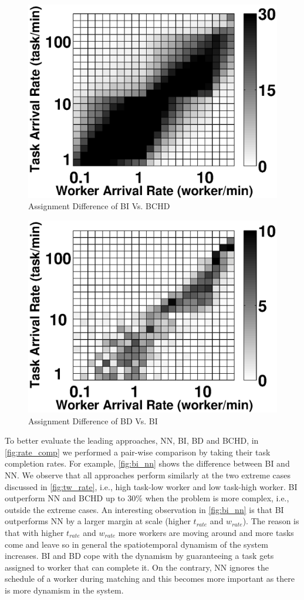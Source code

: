 \begin{figure}[h]
	\centering
	\includegraphics[width = 0.65\columnwidth]{figures/bi_bchd.eps}
	\vspace{-0.1in}
	\caption{Assignment Difference of BI Vs. BCHD}\label{fig:bi_bchd}
\end{figure}

\begin{figure}[h]
	\centering
	\includegraphics[width = 0.65\columnwidth]{figures/emd_bi.eps}
	\vspace{-0.1in}
	\caption{Assignment Difference of BD Vs. BI}\label{fig:emd_bi}
\end{figure}

To better evaluate the leading approaches, NN, BI, BD and BCHD, in \cref{fig:rate_comp} we performed a pair-wise comparison by taking their task completion rates. For example, \cref{fig:bi_nn} shows the difference between BI and NN. We observe that all approaches perform similarly at the two extreme cases discussed in \cref{fig:tw_rate}, i.e., high task-low worker and low task-high worker. BI outperform NN and BCHD up to 30\% when the problem is more complex, i.e., outside the extreme cases. An interesting observation in \cref{fig:bi_nn} is that BI outperforms NN by a larger margin at scale (higher $t_{rate}$ and $w_{rate}$). The reason is that with higher $t_{rate}$ and $w_{rate}$ more workers are moving around and more tasks come and leave so in general the spatiotemporal dynamism of the system increases. BI and BD cope with the dynamism by guaranteeing a task gets assigned to worker that can complete it. On the contrary, NN ignores the schedule of a worker during matching and this becomes more important as there is more dynamism in the system.

